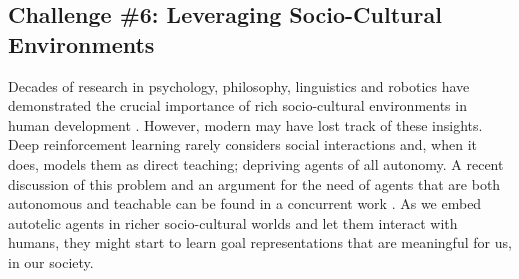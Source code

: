 \subsection{Challenge \#6: Leveraging Socio-Cultural Environments}
Decades of research in psychology, philosophy, linguistics and robotics have demonstrated the crucial importance of rich socio-cultural environments in human development \cite{vygotsky_thought_1934,whorf_language_1956,wood_role_1976,rumelhart_sequential_1986,berk_why_1994,clark_being_1998,tomasello_cultural_1999,tomasello_constructing_2009,zlatev_epigenesis_2001,carruthers_modularity_2002,dautenhahn_embodied_2002,lindblom_social_2003,mirolli_towards_2011,lupyan_what_2012}. However, modern \ai may have lost track of these insights. Deep reinforcement learning rarely considers social interactions and, when it does, models them as direct teaching; depriving agents of all autonomy. A recent discussion of this problem and an argument for the need of agents that are both autonomous and teachable can be found in a concurrent work \cite{sigaud2021towards}. As we embed autotelic agents in richer socio-cultural worlds and let them interact with humans, they might start to learn goal representations that are meaningful for us, in our society. 




